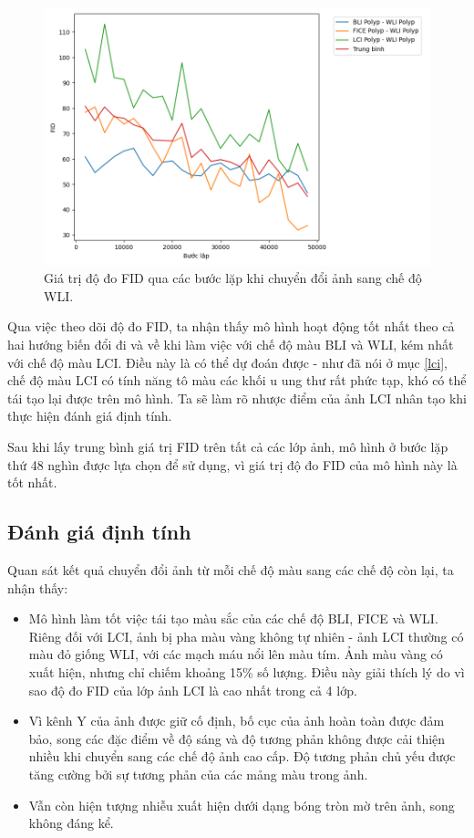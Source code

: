 \documentclass[12pt]{extreport}
\begin{document}
\begin{figure}[H]
    \centering
    \includegraphics[width=\linewidth]{fid/FID_WLI.png}
    \caption{Giá trị độ đo FID qua các bước lặp khi chuyển đổi ảnh sang chế độ WLI.}
\end{figure}

Qua việc theo dõi độ đo FID, ta nhận thấy mô hình hoạt động tốt nhất theo cả hai hướng biến đổi đi và về khi làm việc với chế độ màu BLI và WLI, kém nhất với chế độ màu LCI. Điều này là có thể dự đoán được - như đã nói ở mục \ref{lci}, chế độ màu LCI có tính năng tô màu các khối u ung thư rất phức tạp, khó có thể tái tạo lại được trên mô hình. Ta sẽ làm rõ nhược điểm của ảnh LCI nhân tạo khi thực hiện đánh giá định tính.

Sau khi lấy trung bình giá trị FID trên tất cả các lớp ảnh, mô hình ở bước lặp thứ 48 nghìn được lựa chọn để sử dụng, vì giá trị độ đo FID của mô hình này là tốt nhất.

\subsection{Đánh giá định tính}

Quan sát kết quả chuyển đổi ảnh từ mỗi chế độ màu sang các chế độ còn lại, ta nhận thấy:
\begin{itemize}
    \item Mô hình làm tốt việc tái tạo màu sắc của các chế độ BLI, FICE và WLI. Riêng đối với LCI, ảnh bị pha màu vàng không tự nhiên - ảnh LCI thường có màu đỏ giống WLI, với các mạch máu nổi lên màu tím. Ảnh màu vàng có xuất hiện, nhưng chỉ chiếm khoảng 15\% số lượng. Điều này giải thích lý do vì sao độ đo FID của lớp ảnh LCI là cao nhất trong cả 4 lớp.
    \item Vì kênh Y của ảnh được giữ cố định, bố cục của ảnh hoàn toàn được đảm bảo, song các đặc điểm về độ sáng và độ tương phản không được cải thiện nhiều khi chuyển sang các chế độ ảnh cao cấp. Độ tương phản chủ yếu được tăng cường bởi sự tương phản của các mảng màu trong ảnh.
    \item Vẫn còn hiện tượng nhiễu xuất hiện dưới dạng bóng tròn mờ trên ảnh, song không đáng kể.
\end{itemize}
\end{document}

